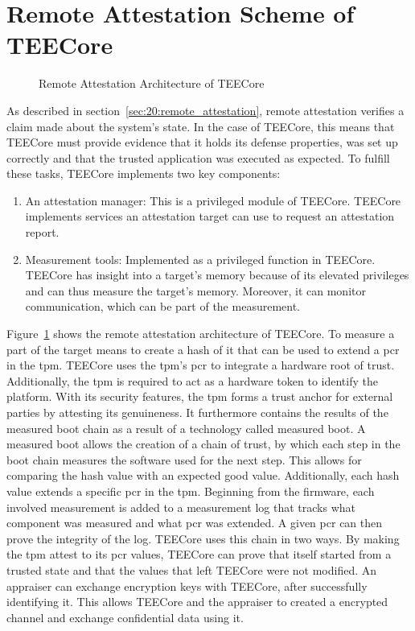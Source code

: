 \section{Remote Attestation Scheme of TEECore}
\label{sec:30:tee_ra_scheme}
\begin{figure}
  \begin{center}
    
    \caption{Remote Attestation Architecture of TEECore}
    \label{fig:30:tee_ra}
  \end{center}
\end{figure}
As described in section~\ref{sec:20:remote_attestation}, remote attestation
verifies a claim made about the system's state. In the case of TEECore, this
means that TEECore must provide evidence that it holds its defense properties,
was set up correctly and that the trusted application was executed as expected.
To fulfill these tasks, TEECore implements two key components:
\begin{enumerate}
  \item An attestation manager: This is a privileged module of
    TEECore. TEECore implements services an attestation target can use to
    request an attestation report.
  \item Measurement tools: Implemented as a privileged function in TEECore.
    TEECore has insight into a target's memory because of its elevated
    privileges and can thus measure the target's memory. Moreover, it can
    monitor communication, which can be part of the measurement.
\end{enumerate}

Figure~\ref{fig:30:tee_ra} shows the remote attestation architecture of TEECore.
To measure a part of the target means to create a hash of it that can be used to
extend a \gls{pcr} in the \gls{tpm}. TEECore uses the \gls{tpm}'s \gls{pcr} to
integrate a hardware root of trust. Additionally, the \gls{tpm} is required to
act as a hardware token to identify the platform. With its security features,
the \gls{tpm} forms a trust anchor for external parties by attesting its
genuineness. It furthermore contains the results of the measured boot chain as a
result of a technology called measured boot. A measured boot allows the creation
of a chain of trust, by which each step in the boot chain measures the software
used for the next step. This allows for comparing the hash value with an
expected good value. Additionally, each hash value extends a specific \gls{pcr}
in the \gls{tpm}. Beginning from the firmware, each involved measurement is
added to a measurement log that tracks what component was measured and what
\gls{pcr} was extended. A given \gls{pcr} can then prove the integrity of the
log. TEECore uses this chain in two ways. By making the \gls{tpm} attest to its
\gls{pcr} values, TEECore can prove that itself started from a trusted state and
that the values that left TEECore were not modified. An appraiser can exchange
encryption keys with TEECore, after successfully identifying it. This allows
TEECore and the appraiser to created a encrypted channel and exchange
confidential data using it.\\

